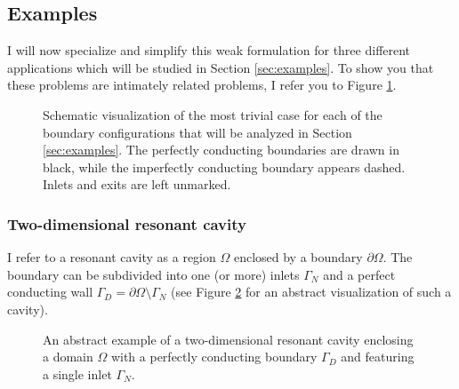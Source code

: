 \documentclass[11pt, a4paper]{article}
\begin{document}
\subsection{Examples}
\label{subsec:examples}

I will now specialize and simplify this weak formulation for three different
applications which will be studied in Section \ref{sec:examples}. To show you
that these problems are intimately related problems, I refer you to Figure \ref{fig:examples}.

\begin{figure}[h]
    \centering
    
    \caption{Schematic visualization of the most trivial case for each of the
    boundary configurations that will be analyzed in Section \ref{sec:examples}.
    The perfectly conducting boundaries are drawn in black, while the imperfectly
    conducting boundary appears dashed. Inlets and exits are left unmarked.}
    \label{fig:examples}
\end{figure}

\subsubsection{Two-dimensional resonant cavity}
\label{subsubsec:cavity}

I refer to a resonant cavity as a region $\Omega$ enclosed by a boundary $\partial \Omega$.
The boundary can be subdivided into one (or more) inlets $\Gamma_N$ and a perfect
conducting wall $\Gamma_D = \partial \Omega \setminus \Gamma_N$
(see Figure \ref{fig:2d-cavity} for an abstract visualization of such a cavity).

\begin{figure}[h]
    \centering
    
    \caption{An abstract example of a two-dimensional resonant cavity enclosing
    a domain $\Omega$ with a perfectly conducting boundary $\Gamma_D$ and
    featuring a single inlet $\Gamma_N$.}
    \label{fig:2d-cavity}
\end{figure}
\end{document}
